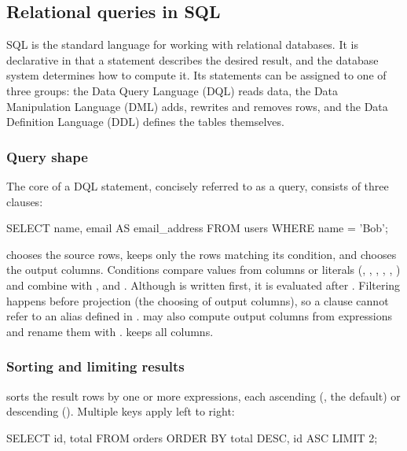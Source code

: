 
\subsection{Relational queries in SQL}
\label{sec:sql}

SQL is the standard language for working with relational databases.
It is declarative in that a statement describes the desired result,
and the database system determines how to compute it.
Its statements can be assigned to one of three groups:
the Data Query Language (DQL) reads data,
the Data Manipulation Language (DML) adds, rewrites and removes rows,
and the Data Definition Language (DDL) defines the tables themselves.

\subsubsection{Query shape}

The core of a DQL statement, concisely referred to as a query,
consists of three clauses:

\begin{sqlblock}
SELECT name, email AS email_address
FROM users
WHERE name = 'Bob';
\end{sqlblock}

 chooses the source rows,
 keeps only the rows matching its condition,
and  chooses the output columns.
Conditions compare values from columns or literals
(\mono{=}, \mono{<>}, \mono{<}, \mono{>}, \mono{<=}, \mono{>=})
and combine with ,  and .
Although  is written first, it is evaluated after .
Filtering happens before projection (the choosing of output columns),
so a  clause cannot refer to an alias defined in .
 may also compute output columns from expressions
and rename them with .  keeps all columns.

\subsubsection{Sorting and limiting results}

 sorts the result rows by one or more expressions,
each ascending (, the default) or descending ().
Multiple keys apply left to right:

\begin{sqlblock}
SELECT id, total
FROM orders
ORDER BY total DESC, id ASC
LIMIT 2;
\end{sqlblock}

